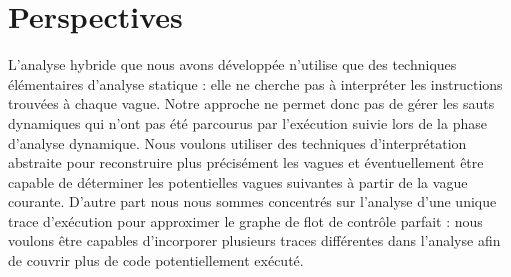 % 
% 







\section*{Perspectives}
L'analyse hybride que nous avons développée n'utilise que des techniques élémentaires d'analyse statique :
elle ne cherche pas à interpréter les instructions trouvées à chaque vague. 
Notre approche ne permet donc pas de gérer les sauts dynamiques qui n'ont pas été parcourus par l'exécution suivie lors de la phase d'analyse dynamique.
Nous voulons utiliser des techniques d’interprétation abstraite pour reconstruire plus précisément les vagues et éventuellement être capable de déterminer les potentielles vagues suivantes à partir de la vague courante.
D'autre part nous nous sommes concentrés sur l'analyse d'une unique trace d'exécution pour approximer le graphe de flot de contrôle parfait : nous voulons être capables d'incorporer plusieurs traces différentes dans l'analyse afin de couvrir plus de code potentiellement exécuté.

